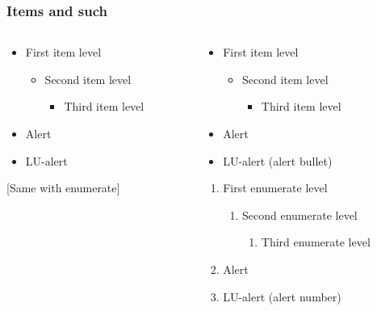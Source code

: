\documentclass[aspectratio=1610]{beamer}
\begin{document}
\begin{frame}[fragile]
  \frametitle{Items and such}
  \begin{columns}[onlytextwidth]
    \begin{column}{0.5\textwidth}
\begin{CodeBox}{}
\begin{itemize}
\item First item level
  \begin{itemize}
  \item Second item level
    \begin{itemize}
    \item Third item level
    \end{itemize}
  \end{itemize}
\item<alert@1> Alert
\item<lualert@1> LU-alert
\end{itemize}

[Same with enumerate]
\end{CodeBox}
    \end{column}%
    \begin{column}{0.5\textwidth}
      \begin{itemize}
      \item First item level
        \begin{itemize}
        \item Second item level
          \begin{itemize}
          \item Third item level
          \end{itemize}
        \end{itemize}
      \item<alert@1> Alert
      \item<lualert@1> LU-alert (alert bullet)
      \end{itemize}
      \begin{enumerate}
      \item First enumerate level
        \begin{enumerate}
        \item Second enumerate level
          \begin{enumerate}
          \item Third enumerate level
          \end{enumerate}
        \end{enumerate}
      \item<alert@1> Alert
      \item<lualert@1> LU-alert (alert number)
      \end{enumerate}      
    \end{column}
  \end{columns}
\end{frame}
\end{document}

